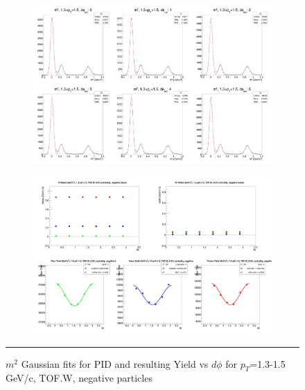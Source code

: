 \begin{figure}[H]
  \centering
    \begin{subfigure}{1\textwidth}
    \includegraphics[width=1\textwidth]{lowptfits/yieldvsdphi_tof1_cent0_ch0_pT-13-15.jpg}
    \end{subfigure}
    \begin{subfigure}{1\textwidth}
    \includegraphics[width=1\textwidth]{lowptfits/fitParams_tof1_cent0_ch0_pT-13-15.jpg}
    \end{subfigure}
    \rule{35em}{0.5pt}
  \caption[PID fits and Yield vs $d\phi$ for $p_T$=1.3-1.5 GeV/c, TOF.W, negative particles ]{$m^2$ Gaussian fits for PID and resulting Yield vs $d\phi$ for $p_T$=1.3-1.5 GeV/c, TOF.W, negative particles}
  \label{fig:fits13-15neg}
\end{figure}


